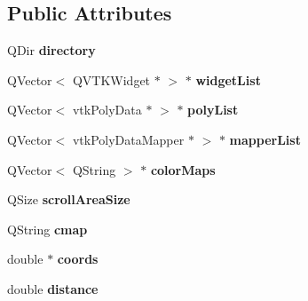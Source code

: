 \subsection*{Public Attributes}
\begin{DoxyCompactItemize}
\item 
\hypertarget{class_share_camera_qt_acdf359f489a474e20335525a1ba0b477}{Q\-Dir {\bfseries directory}}\label{class_share_camera_qt_acdf359f489a474e20335525a1ba0b477}

\item 
\hypertarget{class_share_camera_qt_ad687256e1d737baeb7ed1b3042072073}{Q\-Vector$<$ Q\-V\-T\-K\-Widget $\ast$ $>$ $\ast$ {\bfseries widget\-List}}\label{class_share_camera_qt_ad687256e1d737baeb7ed1b3042072073}

\item 
\hypertarget{class_share_camera_qt_ab8c61f6f50ec786b6774ec44e4124ddf}{Q\-Vector$<$ vtk\-Poly\-Data $\ast$ $>$ $\ast$ {\bfseries poly\-List}}\label{class_share_camera_qt_ab8c61f6f50ec786b6774ec44e4124ddf}

\item 
\hypertarget{class_share_camera_qt_a36a3e4af3d2ef3e4630cc03d9e5f2316}{Q\-Vector$<$ vtk\-Poly\-Data\-Mapper $\ast$ $>$ $\ast$ {\bfseries mapper\-List}}\label{class_share_camera_qt_a36a3e4af3d2ef3e4630cc03d9e5f2316}

\item 
\hypertarget{class_share_camera_qt_a764a540ffcd9fba5efa3d45b694988ad}{Q\-Vector$<$ Q\-String $>$ $\ast$ {\bfseries color\-Maps}}\label{class_share_camera_qt_a764a540ffcd9fba5efa3d45b694988ad}

\item 
\hypertarget{class_share_camera_qt_afd8308fb81d26ec16de7f36765392c31}{Q\-Size {\bfseries scroll\-Area\-Size}}\label{class_share_camera_qt_afd8308fb81d26ec16de7f36765392c31}

\item 
\hypertarget{class_share_camera_qt_a34aaa537d1346772d9259fad97b581cd}{Q\-String {\bfseries cmap}}\label{class_share_camera_qt_a34aaa537d1346772d9259fad97b581cd}

\item 
\hypertarget{class_share_camera_qt_ae64711ba0c69f280c227c5d28b17b4c4}{double $\ast$ {\bfseries coords}}\label{class_share_camera_qt_ae64711ba0c69f280c227c5d28b17b4c4}

\item 
\hypertarget{class_share_camera_qt_a5ee7d6e146a3e347fea37f578104857b}{double {\bfseries distance}}\label{class_share_camera_qt_a5ee7d6e146a3e347fea37f578104857b}


\end{DoxyCompactItemize}
